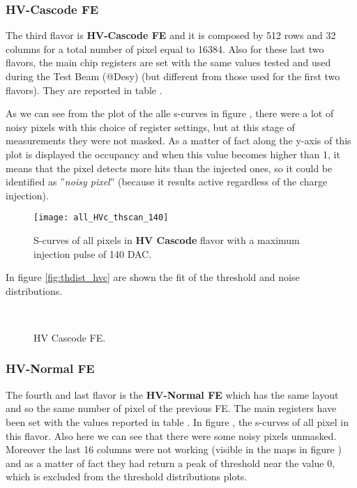 

\subsubsection{HV-Cascode FE}


The third flavor is \textbf{HV-Cascode FE} and it is composed by 512 rows and 32 columns for a total number of pixel equal to 16384. Also for these last two flavors, the main chip registers are set with the same values tested and used during the Test Beam (@Desy) (but different from those used for the first two flavors). They are reported in table  .

As we can see from the plot of the alle s-curves in figure , there were a lot of noisy pixels with this choice of register settings, but at this stage of measurements they were not masked.
As a matter of fact along the y-axis of this plot is displayed the occupancy and when this value becomes higher than 1, it means that the pixel detects more hits than the injected ones, so it could be identified as ''\textit{noisy pixel}'' (because it results active regardless of the charge injection).


\begin{figure}[h!]
\centering
\texttt{[image: all\_HVc\_thscan\_140]}
\caption{S-curves of all pixels in \textbf{HV Cascode} flavor with a maximum injection pulse of 140 DAC.}
\label{fig:hvc_scurve_140}
\end{figure}

In figure \vref{fig:thdist_hvc} are shown the fit of the threshold and noise distributions.

\begin{figure}[h!]
\centering
{}\quad
{}\\
\caption{HV Cascode FE.}
\label{fig:thdist_hvc}
\end{figure}


\subsubsection{HV-Normal FE}\label{first_xtalk}

The fourth and last flavor is the \textbf{HV-Normal FE} which has the same layout and so the same number of pixel of the previous FE. The main registers have been set with the values reported in table .
In figure , the s-curves of all pixel in this flavor. Also here we can see that there were some noisy pixels unmasked.
Moreover the last 16 columns were not working (visible in the maps in figure ) and as a matter of fact they had return a peak of threshold near the value 0, which is excluded from the threshold distributions plots.

